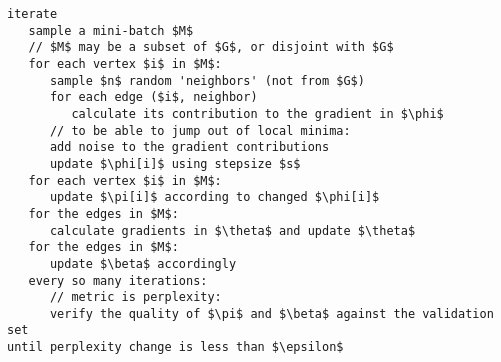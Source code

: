 \begin{comment}
Stochastic: iteratively:
 - sample a mini-batch $M$ (from the graph, or not from G)
 - for each node in the mini-batch:
   sample $n$ random 'neighbors' (not from G)
   for each edge (node, neighbor), calculate its contribution to the gradient
   add noise to the gradient contributions to be able to jump out of local minima
 - sum the gradients for each node in the mini-batch
 - using the gradients, infer new value of $\phi$ for each node in the mini-batch
 - update $\pi$ accordingly
 - calculate the gradients for $\beta$ for the edges in the mini-batch, and
   update $\beta$ and $\theta$
 - every so many iterations:
    + verify the quality of $\pi$ and $\beta$ against the validation set; metric is
      perplexity
    + terminate when perplexity changes less than $\epsilon$
\end{comment}


\begin{lstlisting}[mathescape,caption=SG-MCMC MMSB algorithm,label=algorithm-pseudo-code]
iterate
   sample a mini-batch $M$
   // $M$ may be a subset of $G$, or disjoint with $G$
   for each vertex $i$ in $M$:
      sample $n$ random 'neighbors' (not from $G$)
      for each edge ($i$, neighbor)
         calculate its contribution to the gradient in $\phi$
      // to be able to jump out of local minima:
      add noise to the gradient contributions
      update $\phi[i]$ using stepsize $s$
   for each vertex $i$ in $M$:
      update $\pi[i]$ according to changed $\phi[i]$
   for the edges in $M$:
      calculate gradients in $\theta$ and update $\theta$
   for the edges in $M$:
      update $\beta$ accordingly
   every so many iterations:
      // metric is perplexity:
      verify the quality of $\pi$ and $\beta$ against the validation set
until perplexity change is less than $\epsilon$
\end{lstlisting}
